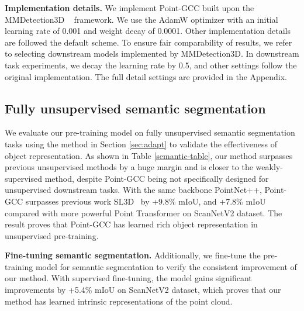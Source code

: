 \documentclass{article}
\begin{document}
\textbf{Implementation details.} We implement Point-GCC built upon the MMDetection3D ~\cite{mmdet3d2020} framework. We use the AdamW optimizer with an initial learning rate of 0.001 and weight decay of 0.0001. Other implementation details are followed the default scheme. 
To ensure fair comparability of results, we refer to selecting downstream models implemented by MMDetection3D. In downstream task experiments, we decay the learning rate by 0.5, and other settings follow the original implementation. The full detail settings are provided in the Appendix.

\subsection{Fully unsupervised semantic segmentation}
\vspace{-0.25cm}
\label{unsupervised-semantic}
We evaluate our pre-training model on fully unsupervised semantic segmentation tasks using the method in Section \ref{sec:adapt} to validate the effectiveness of object representation. As shown in Table \ref{semantic-table}, our method surpasses previous unsupervised methods by a huge margin and is closer to the weakly-supervised method, despite Point-GCC being not speciﬁcally designed for unsupervised downstream tasks. With the same backbone PointNet++, Point-GCC surpasses previous work SL3D~\cite{SL3D} by +9.8\% mIoU, and +7.8\% mIoU compared with more powerful Point Transformer on ScanNetV2 dataset. The result proves that Point-GCC has learned rich object representation in unsupervised pre-training.

\textbf{Fine-tuning semantic segmentation.} Additionally, we fine-tune the pre-training model for semantic segmentation to verify the consistent improvement of our method. With supervised fine-tuning, the model gains significant improvements by +5.4\% mIoU on ScanNetV2 dataset, which proves that our method has learned intrinsic representations of the point cloud.
\end{document}
